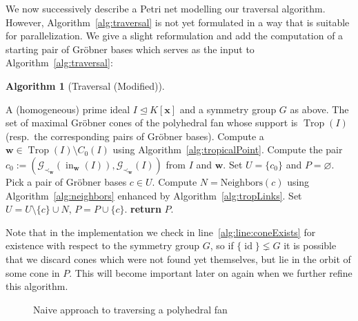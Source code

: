 \documentclass[
  paper=a4,
  titlepage,
  bibliography=totoc,
  pagesize=pdftex
]{scrartcl}
\numberwithin{figure}{section}
\numberwithin{equation}{section}
\numberwithin{table}{section}
\let\vec\mathbf
\let\idealof\trianglelefteq
\DeclareMathOperator{\Trop}{Trop}
\DeclareMathOperator{\initial}{in}
\DeclareMathOperator{\id}{id}
\theoremstyle{definition}
\newtheorem{algo}[definition]{Algorithm}
\numberwithin{definition}{section}
\begin{document}
We now successively describe a Petri net modelling our traversal algorithm. However,
Algorithm~\ref{alg:traversal} is not yet formulated in a way that is suitable for
parallelization. We give a slight reformulation and add the computation of a starting pair
of Gröbner bases which serves as the input to Algorithm~\ref{alg:traversal}:

\begin{algo}[Traversal (Modified)]\
  \label{alg:traversalMod}
  \begin{algorithmic}[1]
    \Require A (homogeneous) prime ideal $I \idealof K[\vec x]$ and a symmetry group $G$
      as above.
    \Ensure The set of maximal Gröbner cones of the polyhedral fan whose support is
      $\Trop(I)$ (resp.\ the corresponding pairs of Gröbner bases).
    \State Compute a $\vec w \in \Trop(I) \setminus C_0(I)$ using
      Algorithm~\ref{alg:tropicalPoint}.
    \State Compute the pair $c_0 := (\mathcal G_{\prec_{\vec w}}(\initial_{\vec w}(I)),
      \mathcal G_{\prec_{\vec w}}(I))$ from $I$ and $\vec w$.
    \State Set $U = \{ c_0 \}$ and $P = \varnothing$.
      \State Pick a pair of Gröbner bases $c \in U$.
       \label{alg:line:coneExists}
        \State Compute $N = \mathrm{Neighbors}(c)$ using Algorithm~\ref{alg:neighbors}
          enhanced by Algorithm~\ref{alg:tropLinks}.
        \State Set $U = U \setminus \{ c \} \cup N$, $P = P \cup \{ c \}$.
      \EndIf
    \EndWhile
    \State\textbf{return} $P$.
  \end{algorithmic}
\end{algo}

Note that in the implementation we check in line~\ref{alg:line:coneExists} for existence
with respect to the symmetry group $G$, so if $\{ \id \} \lneq G$ it is possible that we
discard cones which were not found yet themselves, but lie in the orbit of some cone in
$P$. This will become important later on again when we further refine this algorithm.

\begin{figure}[tbhp]
  \centering
  \caption{Naive approach to traversing a polyhedral fan}
  \label{fig:naive}
\end{figure}
\end{document}
